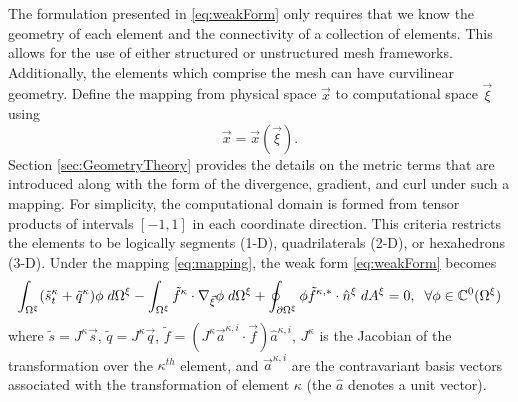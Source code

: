 \documentclass{softwaremanual}
\begin{document}
  The formulation presented in \eqref{eq:weakForm} only requires that we know the geometry of each element and the connectivity of a collection of elements. This allows for the use of either structured or unstructured mesh frameworks. Additionally, the elements which comprise the mesh can have curvilinear geometry. Define the mapping from physical space $\vec{x}$ to computational space $\vec{\xi}$ using
  \begin{equation}
  \vec{x} = \vec{x}(\vec{\xi}).\label{eq:mapping}
  \end{equation}
  Section \ref{sec:GeometryTheory} provides the details on the metric terms that are introduced along with the form of the divergence, gradient, and curl under such a mapping. For simplicity, the computational domain is formed from tensor products of intervals $[-1, 1]$ in each coordinate direction. This criteria restricts the elements to be logically segments (1-D), quadrilaterals (2-D), or hexahedrons (3-D). Under the mapping \eqref{eq:mapping}, the weak form \eqref{eq:weakForm} becomes
  \begin{equation}
  \int_{\Omega^\xi} (\tilde{s}^\kappa_t + \tilde{q}^\kappa) \phi \hspace{1mm} d\Omega^\xi  - \int_{\Omega^\xi} \tilde{f}^\kappa \cdot \nabla_{\vec{\xi}} \phi  \hspace{1mm} d\Omega^\xi + \oint_{\partial \Omega^\xi} \phi \tilde{f}^{\kappa,*}  \cdot \hat{n}^\xi \hspace{1mm} d A^\xi = 0, \hspace{2mm} \forall \phi \in \mathbb{C}^0(\Omega^\xi) \label{eq:mappedWeakForm}
  \end{equation}
  where $\tilde{s} = J^\kappa\vec{s}$, $\tilde{q} = J^\kappa\vec{q}$, $\tilde{f} = ( J^\kappa \vec{a}^{\kappa,i} \cdot \vec{f} ) \hat{a}^{\kappa,i}$, $J^{\kappa}$ is the Jacobian of the transformation over the $\kappa^{th}$ element, and $\vec{a}^{\kappa,i}$ are the contravariant basis vectors associated with the transformation of element $\kappa$ (the $\hat{a}$ denotes a unit vector).\\
  
\end{document}
